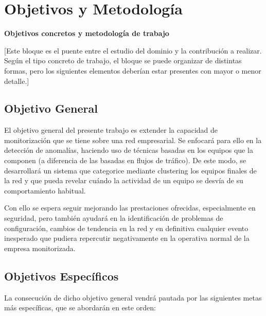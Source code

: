 \chapter{Objetivos y Metodología}\label{chap:objetivos}
\textbf{Objetivos concretos y metodología de trabajo}

[Este bloque es el puente entre el estudio del dominio y la contribución a realizar. Según el tipo concreto de trabajo, el bloque se puede organizar de distintas formas, pero los siguientes elementos deberían estar presentes con mayor o menor detalle.]

\section{Objetivo General}\label{sec:objgeneral}
El objetivo general del presente trabajo es extender la capacidad de monitorización que se tiene sobre una red empresarial.
Se enfocará para ello en la detección de anomalías, haciendo uso de técnicas basadas en los equipos que la componen (a diferencia de las basadas en flujos de tráfico).
De este modo, se desarrollará un sistema que categorice mediante clustering los equipos finales de la red
y que pueda revelar cuándo la actividad de un equipo se desvía de su comportamiento habitual.

Con ello se espera seguir mejorando las prestaciones ofrecidas, especialmente en seguridad, pero también ayudará en la identificación de problemas de configuración, cambios de tendencia en la red y en definitiva cualquier evento inesperado que pudiera repercutir negativamente en la operativa normal de la empresa monitorizada.

\section{Objetivos Específicos}\label{sec:objespecificos}
La consecución de dicho objetivo general vendrá pautada por las siguientes metas más específicas, que se abordarán en este orden:

